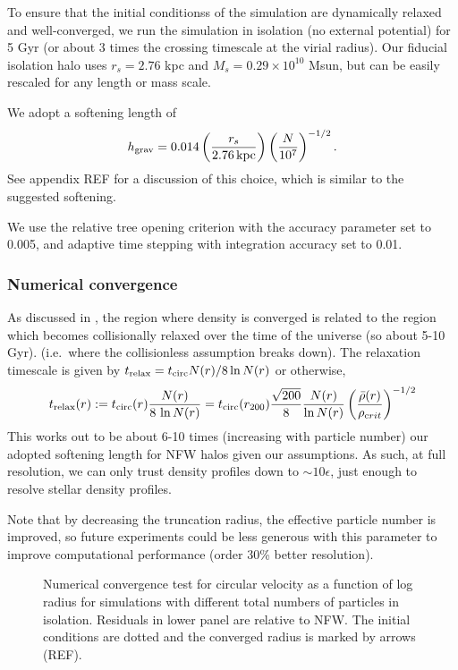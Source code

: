To ensure that the initial conditionss of the simulation are dynamically
relaxed and well-converged, we run the simulation in isolation (no
external potential) for 5 Gyr (or about 3 times the crossing timescale
at the virial radius). Our fiducial isolation halo uses \(r_s=2.76\) kpc
and \(M_s = 0.29 \times 10^{10}\) Msun, but can be easily rescaled for
any length or mass scale.

We adopt a softening length of \begin{equation}{
h_{\rm grav} = 0.014 \left(\frac{r_s}{2.76\,{\rm kpc}}\right)\left(\frac{N}{10^7}\right)^{-1/2}.
}\end{equation} See appendix REF for a discussion of this choice, which
is similar to the \citet{power+2003} suggested softening.

We use the relative tree opening criterion with the accuracy parameter
set to 0.005, and adaptive time stepping with integration accuracy set
to 0.01.

\subsubsection{Numerical convergence}\label{numerical-convergence}

As discussed in \citet{power+2003}, the region where density is
converged is related to the region which becomes collisionally relaxed
over the time of the universe (so about 5-10 Gyr). (i.e.~where the
collisionless assumption breaks down). The relaxation timescale is given
by \(t_{\rm relax} = t_{\rm circ} N(r) / 8\ln N(r)\) or otherwise,
\begin{equation}{
t_{\rm relax}(r) := t_{\rm circ}(r) \frac{N(r)}{8\,\ln N(r)}
= {t_{\rm circ}(r_{200})} \frac{\sqrt{200}}{8} \frac{N(r)}{\ln N(r)} \left(\frac{\bar \rho (r)}{\rho_{\textrm crit}}\right)^{-1/2}
}\end{equation} This works out to be about 6-10 times (increasing with
particle number) our adopted softening length for NFW halos given our
assumptions. As such, at full resolution, we can only trust density
profiles down to \(\sim10\epsilon\), just enough to resolve stellar
density profiles.

Note that by decreasing the truncation radius, the effective particle
number is improved, so future experiments could be less generous with
this parameter to improve computational performance (order 30\% better
resolution).

\begin{figure}
\centering
{}
\caption[Numerical halo convergence]{Numerical convergence test for
circular velocity as a function of log radius for simulations with
different total numbers of particles in isolation. Residuals in lower
panel are relative to NFW. The initial conditions are dotted and the
converged radius is marked by arrows
(REF).}\label{fig:numerical_convergance}
\end{figure}

